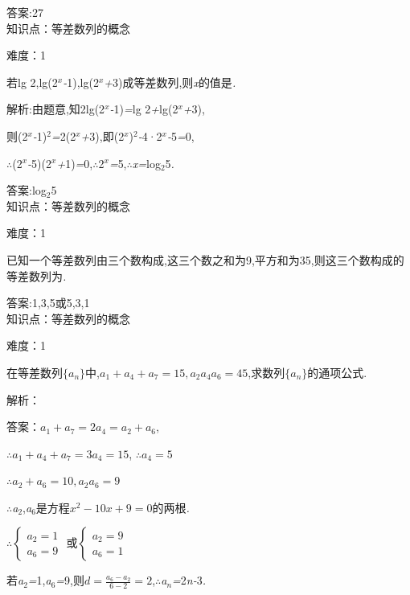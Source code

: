\documentclass{article} %
\begin{document}
 答案:27 \\

知识点：等差数列的概念

难度：1

 若lg 2,lg(2\textit{${}^{x}$-}1),lg(2\textit{${}^{x}$+}3)成等差数列,则\textit{x}的值是\textit{\underbar{　　　　　　}.~}

 解析:由题意,知2lg(2\textit{${}^{x}$-}1)\textit{=}lg 2\textit{+}lg(2\textit{${}^{x}$+}3),

则(2\textit{${}^{x}$-}1)${}^{2}$\textit{=}2(2\textit{${}^{x}$+}3),即(2\textit{${}^{x}$})${}^{2}$\textit{-}4·2\textit{${}^{x}$-}5\textit{=}0,

\textit{$\therefore$}(2\textit{${}^{x}$-}5)(2\textit{${}^{x}$+}1)\textit{=}0,\textit{$\therefore$}2\textit{${}^{x}$=}5,\textit{$\therefore$x=}log${}_{2}$5\textit{.}

 答案:log${}_{2}$5 \\

知识点：等差数列的概念

难度：1

 已知一个等差数列由三个数构成,这三个数之和为9,平方和为35,则这三个数构成的等差数列为\textit{\underbar{　　　　　　　　　　　　　　}.~}

 答案:1,3,5或5,3,1 \\

知识点：等差数列的概念

难度：1

 在等差数列$\{a_n\}$中,$a_1+a_4+a_7=15,a_2a_4a_6=45$,求数列$\{a_n\}$的通项公式.

解析：

 答案：$a_1+a_7=2a_4=a_2+a_6$,

$\therefore a_1+a_4+a_7=3a_4=15$, $\therefore a_4=5$

$\therefore a_2+a_6=10, a_2a_6=9$

\textit{$\therefore$a}${}_{2}$,\textit{a}${}_{6}$是方程$x^2-10x+9 = 0$的两根\textit{.}

$\therefore \left\{
\begin{array}{l}
a_2=1 \\
a_6=9
\end{array}
\right.$ 或$\left\{
\begin{array}{l}
a_2=9 \\
a_6=1
\end{array}
\right.$

若\textit{a}${}_{2}$\textit{=}1,\textit{a}${}_{6}$\textit{=}9,则$d = \frac{a_6 - a_2}{6-2} = 2$,\textit{$\therefore$a${}_{n}$=}2\textit{n-}3\textit{.}
\end{document}
